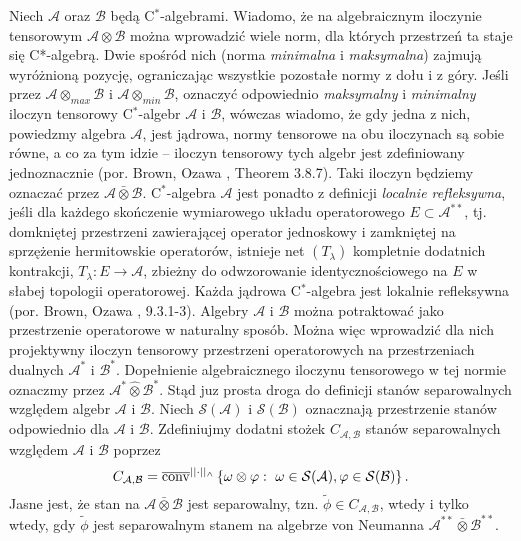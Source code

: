 Niech  $\mathcal{A}$ oraz $\mathcal{B}$ będą C$^{*}$-algebrami.
Wiadomo, że na algebraicznym iloczynie tensorowym
$\mathcal{A} \otimes \mathcal{B}$ można wprowadzić wiele norm,
dla których przestrzeń ta staje się C*-algebrą.
Dwie spośród nich (norma \emph{minimalna} i \emph{maksymalna})
zajmują wyróżnioną pozycję, ograniczając wszystkie pozostałe normy z dołu i z góry.
Jeśli przez $\mathcal{A} \otimes_{max} \mathcal{B}$
i $\mathcal{A} \otimes_{min} \mathcal{B}$,
oznaczyć odpowiednio
\emph{maksymalny} i \emph{minimalny}
iloczyn tensorowy C$^{*}$-algebr $\mathcal{A}$ i $\mathcal{B}$,
wówczas wiadomo, że gdy jedna z nich, powiedzmy algebra $\mathcal{A}$,
jest jądrowa, normy tensorowe na obu iloczynach są sobie równe,
a co za tym idzie -- iloczyn tensorowy tych algebr jest zdefiniowany
jednoznacznie (por. Brown, Ozawa \cite{Brown2008}, Theorem 3.8.7).
Taki iloczyn będziemy oznaczać przez
$\mathcal{A} \bar{\otimes} \mathcal{B}$.
C$^{*}$-algebra $\mathcal{A}$ jest ponadto z definicji \emph{localnie refleksywna},
jeśli dla każdego skończenie wymiarowego układu operatorowego
$E \subset \mathcal{A}^{**}$,
tj. domkniętej przestrzeni zawierającej operator jednoskowy i zamkniętej
na sprzężenie hermitowskie operatorów,
istnieje net $(T_{\lambda})$ kompletnie dodatnich kontrakcji,
$T_{\lambda}: E \rightarrow \mathcal{A}$,
zbieżny do odwzorowanie identycznościowego na $E$
w słabej topologii operatorowej.
Każda jądrowa C$^{*}$-algebra jest lokalnie refleksywna
(por. Brown, Ozawa \cite{Brown2008}, 9.3.1-3).
Algebry $\mathcal{A}$ i $\mathcal{B}$
można potraktować jako przestrzenie operatorowe w naturalny sposób.
Można więc wprowadzić dla nich projektywny iloczyn tensorowy
przestrzeni operatorowych na przestrzeniach dualnych
$\mathcal{A}^{*}$ i $\mathcal{B}^{*}$.
Dopełnienie algebraicznego iloczynu tensorowego w tej normie oznaczmy przez
$\mathcal{A}^{*} \hat{\otimes} \mathcal{B}^{*}$.
Stąd juz prosta droga do definicji stanów separowalnych względem
algebr $\mathcal{A}$ i  $\mathcal{B}$.
Niech
$\mathcal{S}(\mathcal{A})$ i $\mathcal{S}(\mathcal{B})$
oznacznają przestrzenie stanów odpowiednio dla $\mathcal{A}$ i $\mathcal{B}$.
Zdefiniujmy dodatni stożek $C_{\mathcal{A},\mathcal{B}}$
stanów separowalnych względem  $\mathcal{A}$ i $\mathcal{B}$ poprzez
\begin{equation}
C_{\mathcal{A},\mathcal{B}} =
\overline{{\rm conv}}^{||\cdot||_{\wedge}}
\left \{\omega \otimes \varphi: \, \,\omega \in \mathcal{S}(\mathcal{A}),
\varphi \in \mathcal{S}(\mathcal{B})\right \}.
\end{equation}
Jasne jest, że stan na $\mathcal{A} \bar{\otimes} \mathcal{B}$ jest separowalny,
tzn. $\tilde{\phi} \in C_{\mathcal{A}, \mathcal{B}}$,
wtedy i tylko wtedy, gdy $\tilde{\phi}$ jest separowalnym stanem na
algebrze von Neumanna $\mathcal{A}^{**} \bar{\otimes} \mathcal{B}^{**}$.

